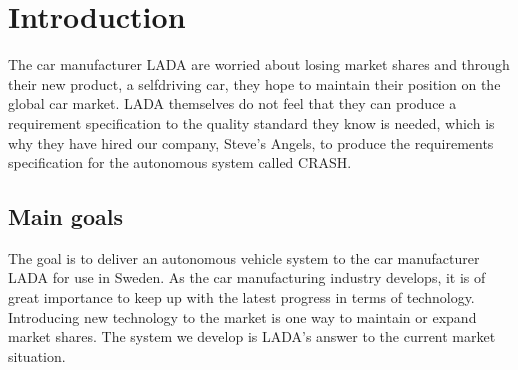 \documentclass{article}
\begin{document}

\titleformat{\subsubsection}[runin]{\large\bfseries}{}{0pt}{#1\quad\thesubsubsection}


\begingroup
\hypersetup{linkcolor=black}
\tableofcontents
\thispagestyle{empty}
\endgroup
\newpage
\begingroup
\hypersetup{linkcolor=black}
\listoffigures
\thispagestyle{empty}
\endgroup
\newpage
{}

\section{Introduction}
The car manufacturer LADA are worried about losing market shares and through their new product, a selfdriving car, they hope to maintain their position on the global car market. LADA themselves do not feel that they can produce a requirement specification to the quality standard they know is needed, which is why they have hired our company, Steve's Angels, to produce the requirements specification for the autonomous system called CRASH. 

\subsection{Main goals}
The goal is to deliver an autonomous vehicle system to the car manufacturer LADA for use in Sweden. As the car manufacturing industry develops, it is of great importance to keep up with the latest progress in terms of technology. Introducing new technology to the market is one way to maintain or expand market shares. The system we develop is LADA's answer to the current market situation.
\end{document}
